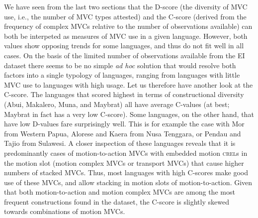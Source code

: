 We have seen from the last two sections that the D-score (the diversity of MVC use, i.e., the number of MVC types attested) and the C-score (derived from the frequency of complex MVCs relative to the number of observations available) can both be interpeted as measures of MVC use in a given language. However, both values show opposing trends for some languages, and thus do not fit well in all cases. On the basis of the limited number of observations available from the EI dataset there seems to be no simple \textit{ad hoc} solution that would resolve both factors into a single typology of languages, ranging from languages with little MVC use to languages with high usage. Let us therefore have another look at the C-score. The languages that scored highest in terms of constructional diversity (Abui, Makalero, Muna, and Maybrat) all have average C-values (at best; Maybrat in fact has a very low C-score). Some  languages, on the other hand, that have low D-values fare surprisingly well. This is for example the case with Mor from Western Papua, Alorese and Kaera from Nusa Tenggara, or Pendau and Tajio from Sulawesi. A closer inspection of these languages reveals that it is predominantly cases of motion-to-action MVCs with embedded motion \textsc{crel}s in the motion slot (motion complex MVCs or transport MVCs) that cause higher numbers of stacked MVCs. Thus, most languages with high C-scores make good use of these MVCs, and allow stacking in motion slots of motion-to-action. Given that both motion-to-action and motion complex MVCs are among the most frequent constructions found in the dataset, the C-score is slightly skewed towards combinations of motion MVCs.

